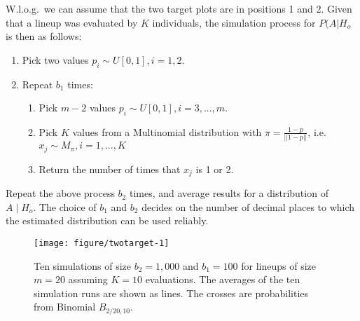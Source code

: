 \documentclass[12pt]{article}\usepackage[]{graphicx}\usepackage[]{color}
\newenvironment{knitrout}{}{} %
\begin{document}
\begin{appendix}
W.l.o.g.~we can assume that the two target plots are in positions 1 and 2. 
Given that a lineup was evaluated by $K$ individuals, the simulation process for $P(A|H_o$ is then as follows:
%
\begin{enumerate}
\item Pick two values $p_i \sim U[0,1], i=1, 2$.
\item Repeat $b_1$ times:
\begin{enumerate}
    \item Pick $m-2$ values $p_i \sim U[0,1], i=3, ..., m$.
    \item Pick $K$ values from a Multinomial distribution with $\pi = \frac{1-p}{|| 1- p||}$, i.e. $x_j \sim M_\pi, i=1, ..., K$
    \item Return the number of times that $x_j$ is 1 or 2. 
\end{enumerate} 
\end{enumerate}
Repeat the above process $b_2$ times, and average results for a distribution of $A \mid H_o$. 
The choice of $b_1$ and $b_2$ decides on the number of decimal places to which the estimated distribution can be used reliably. 

\begin{figure}

\begin{knitrout}
\color{fgcolor}

{\centering \texttt{[image: figure/twotarget-1]} 

}



\end{knitrout}
\caption{\label{fig:simulation} Ten simulations of size $b_2 = 1,000$ and $b_1 = 100$ for lineups of size $m=20$ assuming $K=10$ evaluations. The averages of the ten simulation runs are shown as lines. The crosses are probabilities from  Binomial $B_{2/20, 10}$.}
\end{figure}
\end{appendix}
\end{document}
